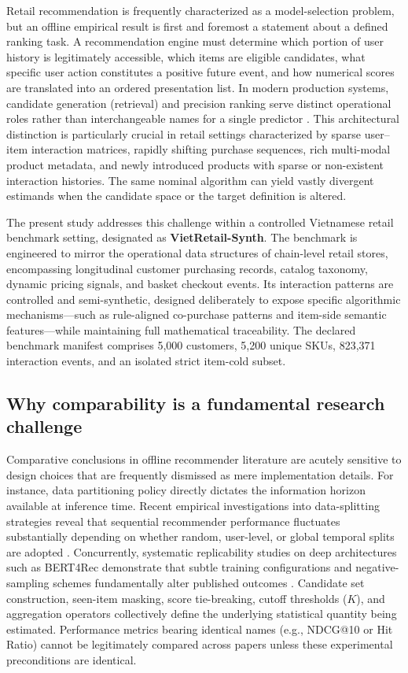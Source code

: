 \documentclass[10pt,a4paper]{article}
\begin{document}
Retail recommendation is frequently characterized as a model-selection problem, but an offline empirical result is first and foremost a statement about a defined ranking task. A recommendation engine must determine which portion of user history is legitimately accessible, which items are eligible candidates, what specific user action constitutes a positive future event, and how numerical scores are translated into an ordered presentation list. In modern production systems, candidate generation (retrieval) and precision ranking serve distinct operational roles rather than interchangeable names for a single predictor \cite{covington2016_youtube, yi2019_ndr}. This architectural distinction is particularly crucial in retail settings characterized by sparse user--item interaction matrices, rapidly shifting purchase sequences, rich multi-modal product metadata, and newly introduced products with sparse or non-existent interaction histories. The same nominal algorithm can yield vastly divergent estimands when the candidate space or the target definition is altered.

The present study addresses this challenge within a controlled Vietnamese retail benchmark setting, designated as \textbf{VietRetail-Synth}. The benchmark is engineered to mirror the operational data structures of chain-level retail stores, encompassing longitudinal customer purchasing records, catalog taxonomy, dynamic pricing signals, and basket checkout events. Its interaction patterns are controlled and semi-synthetic, designed deliberately to expose specific algorithmic mechanisms—such as rule-aligned co-purchase patterns and item-side semantic features—while maintaining full mathematical traceability. The declared benchmark manifest comprises 5,000 customers, 5,200 unique SKUs, 823,371 interaction events, and an isolated strict item-cold subset.

\subsection{Why comparability is a fundamental research challenge}

Comparative conclusions in offline recommender literature are acutely sensitive to design choices that are frequently dismissed as mere implementation details. For instance, data partitioning policy directly dictates the information horizon available at inference time. Recent empirical investigations into data-splitting strategies reveal that sequential recommender performance fluctuates substantially depending on whether random, user-level, or global temporal splits are adopted \cite{gusak2025_time_split}. Concurrently, systematic replicability studies on deep architectures such as BERT4Rec demonstrate that subtle training configurations and negative-sampling schemes fundamentally alter published outcomes \cite{petrov2022_a_systematic_review_and_replicability_study_of_bert4rec_fo}. Candidate set construction, seen-item masking, score tie-breaking, cutoff thresholds ($K$), and aggregation operators collectively define the underlying statistical quantity being estimated. Performance metrics bearing identical names (e.g., NDCG@10 or Hit Ratio) cannot be legitimately compared across papers unless these experimental preconditions are identical.
\end{document}
